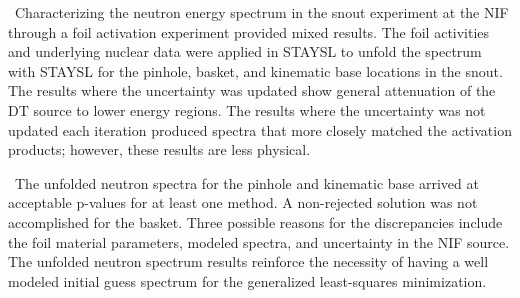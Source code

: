 \documentclass[journal]{IEEEtran}
\begin{document}
\ Characterizing the neutron energy spectrum in the snout experiment at the NIF through a foil activation experiment provided mixed results. The foil activities and underlying nuclear data were applied in STAYSL to unfold the spectrum with STAYSL for the pinhole, basket, and kinematic base locations in the snout. The results where the uncertainty was updated show general attenuation of the DT source to lower energy regions. The results where the uncertainty was not updated each iteration produced spectra that more closely matched the activation products; however, these results are less physical. 

\ The unfolded neutron spectra for the pinhole and kinematic base arrived at acceptable p-values for at least one method. A non-rejected solution was not accomplished for the basket. Three possible reasons for the discrepancies include the foil material parameters, modeled spectra, and uncertainty in the NIF source.  The unfolded neutron spectrum results reinforce the necessity of having a well modeled initial guess spectrum for the generalized least-squares minimization. 

	\ifCLASSOPTIONcaptionsoff
	\newpage
	\fi
	
\end{document}
